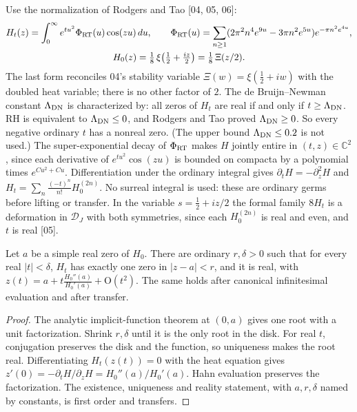 \documentclass[11pt,a4paper]{article}
\numberwithin{equation}{section}
\theoremstyle{definition}
\theoremstyle{remark}
\newcommand{\C}{\mathbb C}
\newcommand{\DJs}{\mathcal D_{J}}
\newcommand{\src}[1]{\textup{[#1]}}
\newcommand{\bigO}{\mathrm{O}}
\begin{document}
Use the normalization of Rodgers and Tao \cite{RT} \src{04, 05, 06}:
\begin{gather*}
H_t(z)=\int_0^\infty e^{tu^2}\Phi_{\rm RT}(u)\cos(zu)\,du,\qquad
\Phi_{\rm RT}(u)=\sum_{n\ge1}(2\pi^2n^4e^{9u}-3\pi n^2e^{5u})e^{-\pi n^2e^{4u}},\\
H_0(z)=\tfrac18\,\xi\bigl(\tfrac12+\tfrac{iz}2\bigr)=\tfrac18\,\Xi(z/2).
\end{gather*}
The last form reconciles 04's stability variable $\Xi(w)=\xi(\tfrac12+iw)$ with
the doubled heat variable; there is no other factor of $2$. The de
Bruijn--Newman constant $\Lambda_{\rm DN}$ is characterized by: all zeros of
$H_t$ are real if and only if $t\ge\Lambda_{\rm DN}$. RH is equivalent to
$\Lambda_{\rm DN}\le0$, and Rodgers and Tao proved $\Lambda_{\rm DN}\ge0$. So
every negative ordinary $t$ has a nonreal zero. (The upper bound
$\Lambda_{\rm DN}\le0.2$ is not used.) The
super-exponential decay of $\Phi_{\rm RT}$ makes $H$ jointly entire in $(t,z)\in\C^2$,
since each derivative of $e^{tu^2}\cos(zu)$ is bounded on compacta by a
polynomial times $e^{Cu^2+Cu}$. Differentiation under the ordinary integral
gives $\partial_tH=-\partial_z^2H$ and
$H_t=\sum_n\frac{(-t)^n}{n!}H_0^{(2n)}$. No surreal integral is used: these are
ordinary germs before lifting or transfer. In the variable
$s=\tfrac12+iz/2$ the formal family $8H_t$ is a deformation in $\DJs$ with both
symmetries, since each $H_0^{(2n)}$ is real and even, and $t$ is real
\src{05}.

\begin{lemma}[Local real-root persistence \src{04, 05, 06}]\label{gz:lem:heatpersist}
Let $a$ be a simple real zero of $H_0$. There are ordinary $r,\delta>0$ such
that for every real $|t|<\delta$, $H_t$ has exactly one zero in $|z-a|<r$, and
it is real, with $z(t)=a+t\frac{H_0''(a)}{H_0'(a)}+\bigO(t^2)$. The same holds
after canonical infinitesimal evaluation and after transfer.
\end{lemma}
\begin{proof}
The analytic implicit-function theorem at $(0,a)$ gives one root with a unit
factorization. Shrink $r,\delta$ until it is the only root in the disk. For
real $t$, conjugation preserves the disk and the function, so uniqueness
makes the root real. Differentiating $H_t(z(t))=0$ with the heat equation
gives $z'(0)=-\partial_tH/\partial_zH=H_0''(a)/H_0'(a)$. Hahn evaluation
preserves the factorization. The existence, uniqueness and reality
statement, with $a,r,\delta$ named by constants, is first order and
transfers.
\end{proof}
\end{document}

